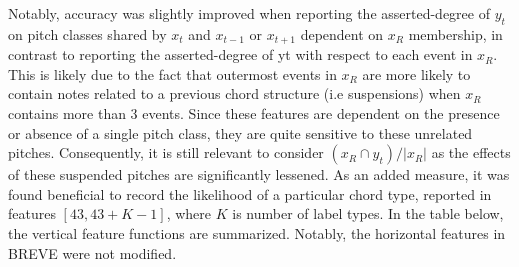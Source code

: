 \documentclass{article} %
\begin{document}
Notably, accuracy was slightly improved when reporting the asserted-degree of $y_t$ on pitch classes shared by $x_t$ and $x_{t-1}$ or $x_{t+1}$ dependent on $x_R$ membership, in contrast to reporting the asserted-degree of yt with respect to each event in $x_R$. This is likely due to the fact that outermost events in $x_R$ are more likely to contain notes related to a previous chord structure (i.e suspensions) when $x_R$ contains more than 3 events. Since these features are dependent on the presence or absence of a single pitch class, they are quite sensitive to these unrelated pitches. Consequently, it is still relevant to consider $( x_R \cap y_t ) / |x_R|$ as the effects of these suspended pitches are significantly lessened. As an added measure, it was found beneficial to record the likelihood of a particular chord type, reported in features $[43, 43 + K - 1]$, where $K$ is number of label types. In the table below, the vertical feature functions are summarized. Notably, the horizontal features in BREVE were not modified.
\end{document}
